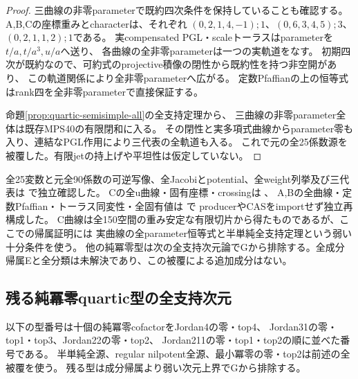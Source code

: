 \documentclass[a4paper,11pt]{ltjsarticle}
\theoremstyle{definition}
\begin{document}
\begin{proof}
三曲線の非零parameterで既約四次条件を保持していることも確認する。
A,B,Cの座標重みとcharacterは、それぞれ
$(0,2,1,4,-1);1$、$(0,6,3,4,5);3$、$(0,2,1,1,2);1$である。
実compensated PGL・scaleトーラスはparameterを$t/a,t/a^3,u/a$へ送り、
各曲線の全非零parameterは一つの実軌道をなす。
初期四次が既約なので、可約式のprojective積像の閉性から既約性を持つ非空開があり、
この軌道関係により全非零parameterへ広がる。
定数Pfaffianの上の恒等式はrank四を全非零parameterで直接保証する。

命題\ref{prop:quartic-semisimple-all}の全支持定理から、
三曲線の非零parameter全体は既存MPS40の有限閉和に入る。
その閉性と実多項式曲線からparameter零も入り、連結なPGL作用により三代表の全軌道も入る。
これで元の全25係数源を被覆した。有限jetの持上げや平坦性は仮定していない。
\end{proof}
全25変数と元全90係数の可逆写像、全Jacobiとpotential、全weight列挙及び三代表は
で独立確認した。
Cの全u曲線・固有座標・crossingは
、
A,Bの全曲線・定数Pfaffian・トーラス同変性・全固有値は
で
producerやCASをimportせず独立再構成した。
C曲線は全150空間の重み安定な有限切片から得たものであるが、ここでの帰属証明には
実曲線の全parameter恒等式と半単純全支持定理という弱い十分条件を使う。
他の純冪零型は次の全支持次元論でGから排除する。全成分帰属Eと全分類は未解決であり、この被覆による追加成分はない。

\subsection{残る純冪零quartic型の全支持次元}
以下の型番号は十個の純冪零cofactorをJordan4の零・top4、
Jordan31の零・top1・top3、Jordan22の零・top2、
Jordan211の零・top1・top2の順に並べた番号である。
半単純全源、regular nilpotent全源、最小冪零の零・top2は前述の全被覆を使う。
残る型は成分帰属より弱い次元上界でGから排除する。
\end{document}
